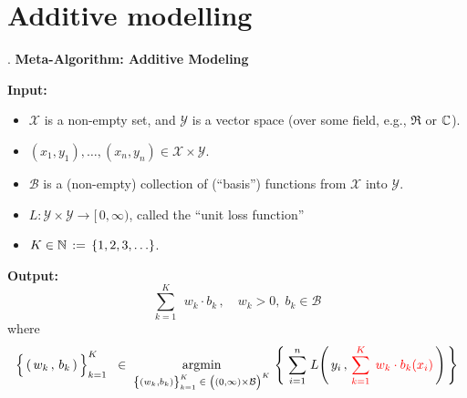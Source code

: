 

\section{Additive modelling}
\setcounter{theorem}{0}
\setcounter{equation}{0}


\renewcommand{\theenumi}{\roman{enumi}}
\renewcommand{\labelenumi}{\textnormal{(\theenumi)}$\;\;$}


\renewcommand{\theenumi}{\arabic{enumi}}
\renewcommand{\labelenumi}{\textnormal{(\theenumi)}$\;\;$}
\renewcommand{\labelenumii}{\textnormal{(\theenumii)}$\;\;$}

\begin{center}
\begin{minipage}{6in}
\begin{tcolorbox}[width=0.95\linewidth,colback=white,colframe=gray]
	\begin{center}
	{\color{white}.}\vskip 0.1cm
	\textbf{\large Meta-Algorithm: Additive Modeling}
	\end{center}
	\textbf{Input:}
	\begin{itemize}
	\item
		$\mathcal{X}$ is a non-empty set, and $\mathcal{Y}$ is a vector space (over some field, e.g., $\Re$ or $\mathbb{C}$).
	\item
		$(x_{1},y_{1}), \ldots, (x_{n},y_{n}) \in \mathcal{X} \times \mathcal{Y}$.
	\item
		$\mathcal{B}$ is a (non-empty) collection of (``basis'') functions from $\mathcal{X}$ into $\mathcal{Y}$.
	\item
		$L : \mathcal{Y} \times \mathcal{Y} \longrightarrow [\,0,\infty)$, called the ``unit loss function''
	\item
		$K \in \mathbb{N} \,:=\, \{1,2,3,\ldots\}$.
	\end{itemize}
	\textbf{Output:}
	\begin{equation*}
	\overset{K}{\underset{k = 1}{\sum}}\;\,w_{k} \cdot b_{k}\,,
	\quad
	w_{k} > 0,\; b_{k} \in \mathcal{B} 
	\end{equation*}
	where
	\begin{equation*}
	\left\{\,(\,w_{k}\,,\,\overset{{\color{white}.}}{b_{k}}\,)\,\right\}_{k=1}^{K}
	\;\;\in\;
		\underset{
			\left\{(\overset{{\color{white}.}}{w_{k}},b_{k})\right\}_{k=1}^{K}
			\;\in\;
			\left((0,\infty)\overset{{\color{white}.}}{\times}\mathcal{B}\right)^{K}
			}{
			\argmin
			}\,
		\left\{\;
			\overset{n}{\underset{i=1}{\sum}}\;
			L\!\left(\,y_{i}\,,\,{\color{red}\overset{K}{\underset{k = 1}{\sum}}\;\,w_{k} \cdot b_{k}(x_{i})}\,\right)
			\,\right\}
	\end{equation*}
\end{tcolorbox}
\end{minipage}
\end{center}

\renewcommand{\theenumi}{\roman{enumi}}
\renewcommand{\labelenumi}{\textnormal{(\theenumi)}$\;\;$}

